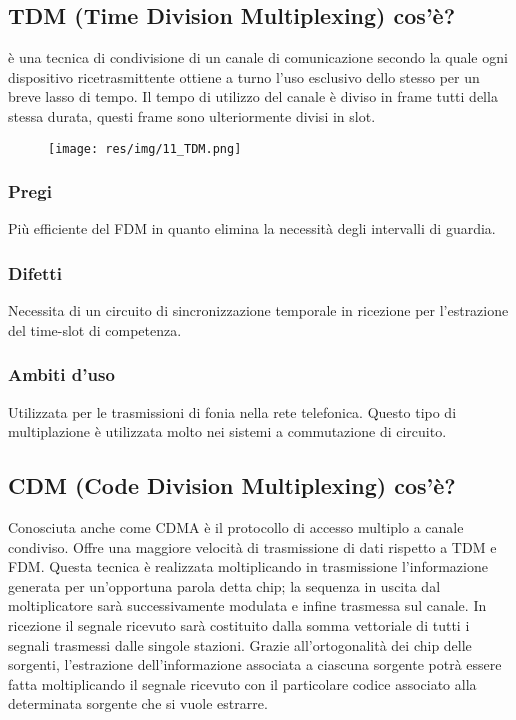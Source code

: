 \subsection{TDM (Time Division Multiplexing) cos'è?}
è una tecnica di condivisione di un canale di comunicazione secondo la quale ogni dispositivo ricetrasmittente ottiene a turno l'uso esclusivo dello stesso per un breve lasso di tempo. Il tempo di utilizzo del canale è diviso in frame tutti della stessa durata, questi frame sono ulteriormente divisi in slot.

\begin{figure}[H]
\centering
\texttt{[image: res/img/11\_TDM.png]}
\end{figure} 

\subsubsection{Pregi}
Più efficiente del FDM in quanto elimina la necessità degli intervalli di guardia.

\subsubsection{Difetti}
Necessita di un circuito di sincronizzazione temporale in ricezione per l'estrazione del time-slot di competenza.

\subsubsection{Ambiti d'uso}
Utilizzata per le trasmissioni di fonia nella rete telefonica. Questo tipo di multiplazione è utilizzata molto nei sistemi a commutazione di circuito.

\subsection{CDM (Code Division Multiplexing) cos'è?}
Conosciuta anche come CDMA è il protocollo di accesso multiplo a canale condiviso. Offre una maggiore velocità di trasmissione di dati rispetto a TDM e FDM.
Questa tecnica è realizzata moltiplicando in trasmissione l'informazione generata per un'opportuna parola detta chip; la sequenza in uscita dal moltiplicatore sarà successivamente modulata e infine trasmessa sul canale.
In ricezione il segnale ricevuto sarà costituito dalla somma vettoriale di tutti i segnali trasmessi dalle singole stazioni. Grazie all'ortogonalità dei chip delle sorgenti, l'estrazione dell'informazione associata a ciascuna sorgente potrà essere fatta moltiplicando il segnale ricevuto con il particolare codice associato alla determinata sorgente che si vuole estrarre.


